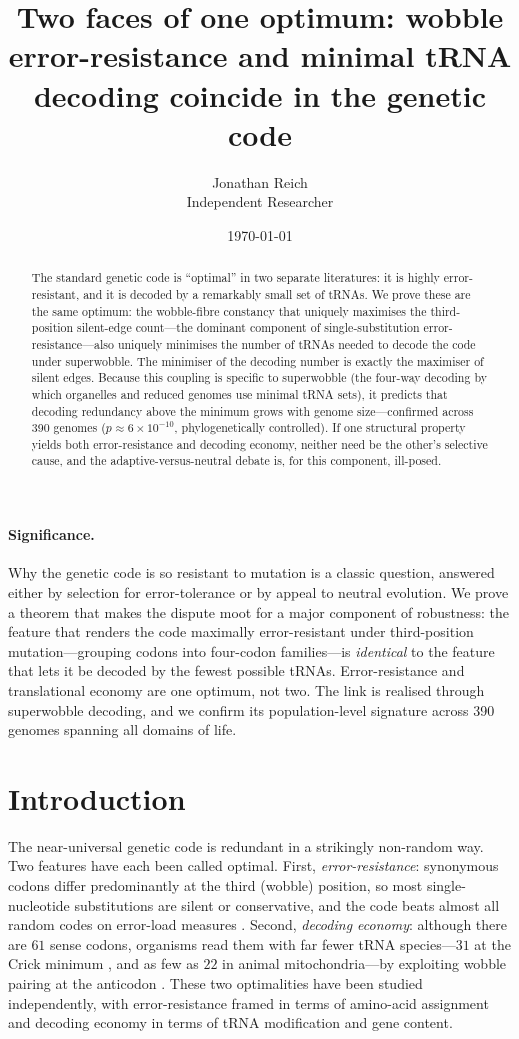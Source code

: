 \documentclass[11pt]{article}
\title{Two faces of one optimum: wobble error-resistance and minimal
tRNA decoding coincide in the genetic code}
\author{Jonathan Reich\\ \normalsize Independent Researcher}
\date{\today}
\theoremstyle{remark}
\begin{document}
\maketitle

\begin{abstract}
The standard genetic code is ``optimal'' in two separate literatures: it is
highly error-resistant, and it is decoded by a remarkably small set of tRNAs. We
prove these are the same optimum: the wobble-fibre constancy that uniquely
maximises the third-position silent-edge count---the dominant component of
single-substitution error-resistance---also uniquely minimises the number of
tRNAs needed to decode the code under superwobble. The minimiser of the decoding
number is exactly the maximiser of silent edges. Because this coupling is
specific to superwobble (the four-way decoding by which organelles and reduced
genomes use minimal tRNA sets), it predicts that decoding redundancy above the
minimum grows with genome size---confirmed across 390 genomes
($p\approx6\times10^{-10}$, phylogenetically controlled). If one structural
property yields both error-resistance and decoding economy, neither need be the
other's selective cause, and the adaptive-versus-neutral debate is, for this
component, ill-posed.
\end{abstract}

\paragraph{Significance.} Why the genetic code is so resistant to mutation is a
classic question, answered either by selection for error-tolerance or by appeal
to neutral evolution. We prove a theorem that makes the dispute moot for a major
component of robustness: the feature that renders the code maximally
error-resistant under third-position mutation---grouping codons into four-codon
families---is \emph{identical} to the feature that lets it be decoded by the
fewest possible tRNAs. Error-resistance and translational economy are one
optimum, not two. The link is realised through superwobble decoding, and we
confirm its population-level signature across 390 genomes spanning all domains of
life.

\section{Introduction}

The near-universal genetic code is redundant in a strikingly non-random way.
Two features have each been called optimal. First, \emph{error-resistance}:
synonymous codons differ predominantly at the third (wobble) position, so most
single-nucleotide substitutions are silent or conservative, and the code beats
almost all random codes on error-load measures \cite{freeland,haig}. Second,
\emph{decoding economy}: although there are $61$ sense codons, organisms read
them with far fewer tRNA species---$31$ at the Crick minimum \cite{crick66},
and as few as $22$ in animal mitochondria---by exploiting wobble pairing at the
anticodon \cite{agris,grosjean}. These two optimalities have been studied
independently, with error-resistance framed in terms of amino-acid assignment
and decoding economy in terms of tRNA modification and gene content.
\end{document}
